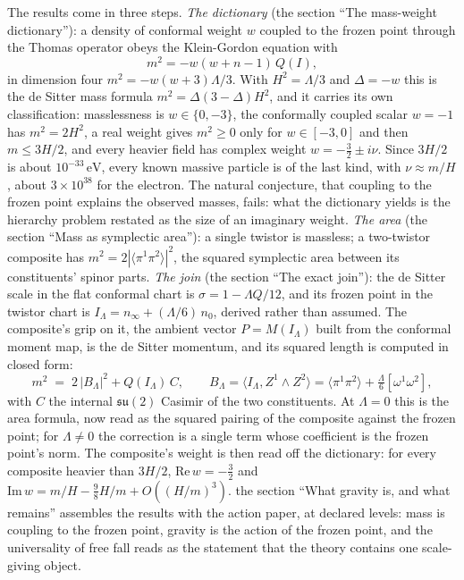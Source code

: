 \documentclass[11pt]{article}
\theoremstyle{definition}
\theoremstyle{plain}
\providecommand{\br}{}\renewcommand{\br}[1]{\langle #1\rangle}
\providecommand{\ip}{}\renewcommand{\ip}[2]{\langle #1, #2\rangle}
\begin{document}
The results come in three steps. \emph{The dictionary} (the section ``The mass-weight dictionary''): a density of conformal weight $w$ coupled to the frozen point through the Thomas operator obeys the Klein-Gordon equation with
\[
m^{2} = -w(w+n-1)\,Q(I),
\]
in dimension four $m^{2} = -w(w+3)\Lambda/3$. With $H^{2} = \Lambda/3$ and $\Delta = -w$ this is the de Sitter mass formula $m^{2} = \Delta(3-\Delta)H^{2}$, and it carries its own classification: masslessness is $w \in \{0, -3\}$, the conformally coupled scalar $w = -1$ has $m^{2} = 2H^{2}$, a real weight gives $m^{2} \ge 0$ only for $w \in [-3, 0]$ and then $m \le 3H/2$, and every heavier field has complex weight $w = -\tfrac32 \pm i\nu$. Since $3H/2$ is about $10^{-33}\,\mathrm{eV}$, every known massive particle is of the last kind, with $\nu \approx m/H$, about $3 \times 10^{38}$ for the electron. The natural conjecture, that coupling to the frozen point explains the observed masses, fails: what the dictionary yields is the hierarchy problem restated as the size of an imaginary weight. \emph{The area} (the section ``Mass as symplectic area''): a single twistor is massless; a two-twistor composite has $m^{2} = 2|\br{\pi^{1}\pi^{2}}|^{2}$, the squared symplectic area between its constituents' spinor parts. \emph{The join} (the section ``The exact join''): the de Sitter scale in the flat conformal chart is $\sigma = 1 - \Lambda Q/12$, and its frozen point in the twistor chart is $I_{\Lambda} = n_{\infty} + (\Lambda/6)\,n_{0}$, derived rather than assumed. The composite's grip on it, the ambient vector $P = M(I_{\Lambda})$ built from the conformal moment map, is the de Sitter momentum, and its squared length is computed in closed form:
\[
m^{2} \;=\; 2\,|B_{\Lambda}|^{2} + Q(I_{\Lambda})\,C, \qquad B_{\Lambda} = \ip{I_{\Lambda}}{Z^{1}\wedge Z^{2}} = \br{\pi^{1}\pi^{2}} + \tfrac{\Lambda}{6}[\omega^{1}\omega^{2}],
\]
with $C$ the internal $\mathfrak{su}(2)$ Casimir of the two constituents. At $\Lambda = 0$ this is the area formula, now read as the squared pairing of the composite against the frozen point; for $\Lambda \neq 0$ the correction is a single term whose coefficient is the frozen point's norm. The composite's weight is then read off the dictionary: for every composite heavier than $3H/2$, $\mathrm{Re}\,w = -\tfrac32$ and $\mathrm{Im}\,w = m/H - \tfrac98 H/m + O((H/m)^{3})$. the section ``What gravity is, and what remains'' assembles the results with the action paper, at declared levels: mass is coupling to the frozen point, gravity is the action of the frozen point, and the universality of free fall reads as the statement that the theory contains one scale-giving object.
\end{document}

